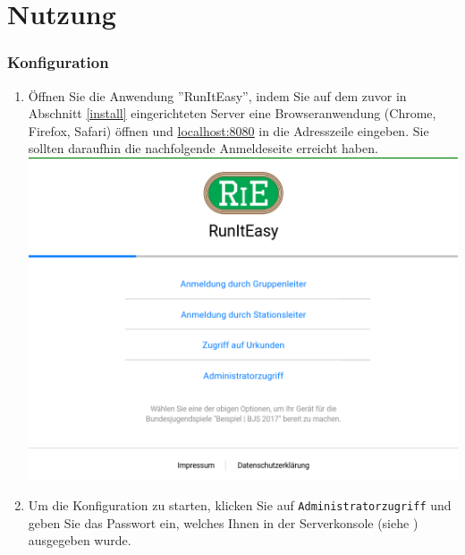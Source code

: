 \documentclass[11pt,a4paper,titlepage,german]{article}
\begin{document}
	\newpage
		
	\part{Nutzung}
		\section{Konfiguration}
			\begin{enumerate}
				\item Öffnen Sie die Anwendung ''RunItEasy'', indem Sie auf dem zuvor in Abschnitt \ref{install} eingerichteten Server eine Browseranwendung (Chrome, Firefox, Safari) öffnen und \href{http://localhost:8080/}{\underline{\color{blue}localhost:8080}} in die Adresszeile eingeben. Sie sollten daraufhin die nachfolgende Anmeldeseite erreicht haben.\\
				\includegraphics[width=\textwidth]{Login}
				
				\item Um die Konfiguration zu starten, klicken Sie auf \texttt{Administratorzugriff} und geben Sie das Passwort ein, welches Ihnen in der Serverkonsole (siehe ) ausgegeben wurde.
				

\end{enumerate}
\end{document}
